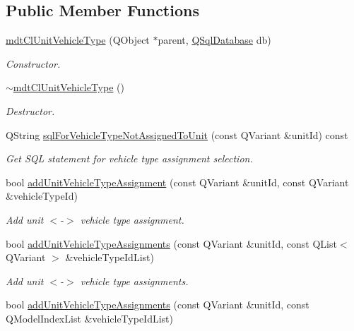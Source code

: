 \subsection*{Public Member Functions}
\begin{DoxyCompactItemize}
\item 
\hyperlink{classmdt_cl_unit_vehicle_type_a887c0df770b0943494c7852f593c795f}{mdt\-Cl\-Unit\-Vehicle\-Type} (Q\-Object $\ast$parent, \hyperlink{class_q_sql_database}{Q\-Sql\-Database} db)
\begin{DoxyCompactList}\small\item\em Constructor. \end{DoxyCompactList}\item 
\hyperlink{classmdt_cl_unit_vehicle_type_a80006aaf243aa3b74d8a5f0fcefbb1fa}{$\sim$mdt\-Cl\-Unit\-Vehicle\-Type} ()
\begin{DoxyCompactList}\small\item\em Destructor. \end{DoxyCompactList}\item 
Q\-String \hyperlink{classmdt_cl_unit_vehicle_type_a94e443219c2136b359b9c3202c489bc9}{sql\-For\-Vehicle\-Type\-Not\-Assigned\-To\-Unit} (const Q\-Variant \&unit\-Id) const 
\begin{DoxyCompactList}\small\item\em Get S\-Q\-L statement for vehicle type assignment selection. \end{DoxyCompactList}\item 
bool \hyperlink{classmdt_cl_unit_vehicle_type_a92a758c6c2fe0d1c0357a1f4b506f50c}{add\-Unit\-Vehicle\-Type\-Assignment} (const Q\-Variant \&unit\-Id, const Q\-Variant \&vehicle\-Type\-Id)
\begin{DoxyCompactList}\small\item\em Add unit $<$-\/$>$ vehicle type assignment. \end{DoxyCompactList}\item 
bool \hyperlink{classmdt_cl_unit_vehicle_type_ab8dfb71baa475692016d867aa687c212}{add\-Unit\-Vehicle\-Type\-Assignments} (const Q\-Variant \&unit\-Id, const Q\-List$<$ Q\-Variant $>$ \&vehicle\-Type\-Id\-List)
\begin{DoxyCompactList}\small\item\em Add unit $<$-\/$>$ vehicle type assignments. \end{DoxyCompactList}\item 
bool \hyperlink{classmdt_cl_unit_vehicle_type_a10380461e506c35417f2367ed94ab9d2}{add\-Unit\-Vehicle\-Type\-Assignments} (const Q\-Variant \&unit\-Id, const Q\-Model\-Index\-List \&vehicle\-Type\-Id\-List)

\end{DoxyCompactItemize}
